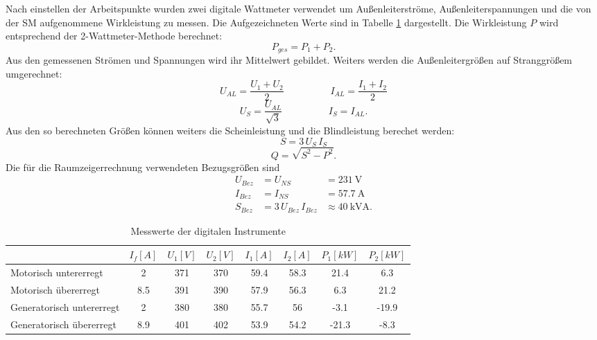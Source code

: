 \noindent Nach einstellen der Arbeitspunkte wurden zwei digitale Wattmeter verwendet um Außenleiterströme, Außenleiterspannungen und die von der SM aufgenommene Wirkleistung zu messen. Die Aufgezeichneten Werte sind in Tabelle \ref{tab:betrzustaende_digitale_messungen} dargestellt. Die Wirkleistung $P$ wird entsprechend der 2-Wattmeter-Methode berechnet:
\begin{equation*}
    P_{ges}=P_1+P_2.
\end{equation*}
Aus den gemessenen Strömen und Spannungen wird ihr Mittelwert gebildet. Weiters werden die Außenleitergrößen auf Stranggrößem umgerechnet:
\begin{equation*}
    U_{AL}=\frac{U_1+U_2}{2}\hspace{2cm}
    I_{AL}=\frac{I_1+I_2}{2}
\end{equation*}
\begin{equation*}
    U_{S}=\frac{U_{AL}}{\sqrt{3}}\hspace{2cm}
    I_{S}=I_{AL}.
\end{equation*}
Aus den so berechneten Größen können weiters die Scheinleistung und die Blindleistung berechet werden:
\begin{equation*}
    S=3\,U_S\,I_S
\end{equation*}
\begin{equation*}
    Q=\sqrt{S^2-P^2}.
\end{equation*}
Die für die Raumzeigerrechnung verwendeten Bezugsgrößen sind 
\begin{align*}
    U_{Bez} &= U_{NS} &= \SI{231}{\volt}\\
    I_{Bez} &= I_{NS} &= \SI{57.7}{\ampere}\\
    S_{Bez} &= 3\,U_{Bez}\,I_{Bez} &\approx \SI{40}{\kilo\volt\ampere}.
\end{align*}
\begin{table}[!ht]
\centering
\begin{tabular}{|l|c|c|c|c|c|c|c|}
\hline
                          & $I_f [A]$ & $U_1 [V]$ & $U_2 [V]$ & $I_1 [A]$ & $I_2 [A]$ & $P_1 [kW]$ & $P_2 [kW]$ \\ \hline
Motorisch untererregt     & 2         & 371       & 370       & 59.4      & 58.3      & 21.4       & 6.3        \\ \hline
Motorisch übererregt      & 8.5       & 391       & 390       & 57.9      & 56.3      & 6.3        & 21.2       \\ \hline
Generatorisch untererregt & 2         & 380       & 380       & 55.7      & 56        & -3.1       & -19.9      \\ \hline
Generatorisch übererregt  & 8.9       & 401       & 402       & 53.9      & 54.2      & -21.3      & -8.3       \\ \hline
\end{tabular}
\caption{Messwerte der digitalen Instrumente}
\label{tab:betrzustaende_digitale_messungen}
\end{table}


